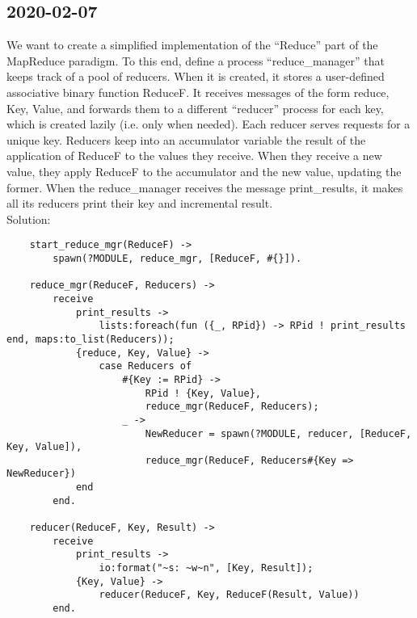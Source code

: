 \subsection{2020-02-07}
We want to create a simplified implementation of the “Reduce” part of the MapReduce paradigm. To this
end, define a process “reduce\_manager” that keeps track of a pool of reducers. When it is created, it
stores a user-defined associative binary function ReduceF. It receives messages of the form {reduce,
Key, Value}, and forwards them to a different “reducer” process for each key, which is created lazily
(i.e. only when needed). Each reducer serves requests for a unique key.
Reducers keep into an accumulator variable the result of the application of ReduceF to the values they
receive. When they receive a new value, they apply ReduceF to the accumulator and the new value,
updating the former. When the reduce\_manager receives the message print\_results, it makes all its
reducers print their key and incremental result.\\
Solution:
\begin{lstlisting}
	start_reduce_mgr(ReduceF) ->
		spawn(?MODULE, reduce_mgr, [ReduceF, #{}]).
	
	reduce_mgr(ReduceF, Reducers) ->
		receive
			print_results ->
				lists:foreach(fun ({_, RPid}) -> RPid ! print_results end, maps:to_list(Reducers));
			{reduce, Key, Value} ->
				case Reducers of
					#{Key := RPid} ->
						RPid ! {Key, Value},
						reduce_mgr(ReduceF, Reducers);
					_ ->
						NewReducer = spawn(?MODULE, reducer, [ReduceF, Key, Value]),
						reduce_mgr(ReduceF, Reducers#{Key => NewReducer})
			end
		end.
	
	reducer(ReduceF, Key, Result) ->
		receive
			print_results ->
				io:format("~s: ~w~n", [Key, Result]);
			{Key, Value} ->
				reducer(ReduceF, Key, ReduceF(Result, Value))
		end.
\end{lstlisting}





